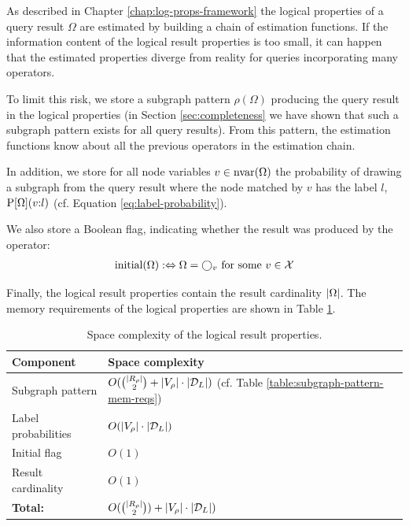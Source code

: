 As described in Chapter \ref{chap:log-props-framework} the logical properties of
a query result $\Omega$ are estimated by building a chain of estimation
functions.
If the information content of the logical result properties is too small,
it can happen that the estimated properties diverge from reality for
queries incorporating many operators.

To limit this risk, we store a subgraph pattern $\rho(\Omega)$ producing the
query result in the logical properties (in Section \ref{sec:completeness} we
have shown that such a subgraph pattern exists for all query results).
From this pattern, the estimation functions know about all the previous
operators in the estimation chain.

In addition, we store for all node variables $v \in \textnormal{nvar}(\Omega)$ the
probability of drawing a subgraph from the query result where the node matched
by $v$ has the label $l$, $\operatorname{P}[\Omega](v{:}l)$
(cf. Equation \ref{eq:label-probability}).

We also store a Boolean flag, indicating whether the result was produced by the
 operator:
\begin{align}
  \textnormal{initial}(\Omega) :\Leftrightarrow \Omega = \bigcirc_{v}
    \text{ for some } v \in \mathcal{X}
\end{align}

Finally, the logical result properties contain the result cardinality
${\left \vert \Omega \right \vert}$.
The memory requirements of the logical properties are shown in Table
\ref{table:neo4j-log-result-props-mem-reqs}.

\begin{table}[H]
\centering
\begin{tabular}{ll}
\toprule
Component                  & Space complexity                                                     \\ \midrule
Subgraph pattern           & $O(\binom{{\left \vert R_\rho \right \vert}}{2} + {\left \vert V_\rho \right \vert} \cdot {\left \vert \mathcal{D}_L\right \vert})$
                             (cf. Table \ref{table:subgraph-pattern-mem-reqs})                    \\[3pt]
Label probabilities        & $O({\left \vert V_\rho \right \vert} \cdot {\left \vert \mathcal{D}_L\right \vert})$                             \\[3pt]
Initial flag               & $O(1)$                                                               \\[3pt]
Result cardinality         & $O(1)$                                                               \\[3pt]
\textbf{Total:}            & $O(\binom{{\left \vert R_\rho \right \vert}}{2}) + {\left \vert V_\rho \right \vert} \cdot {\left \vert \mathcal{D}_L\right \vert})$ \\
\bottomrule
\end{tabular}
\caption{Space complexity of the logical result properties.}
\label{table:neo4j-log-result-props-mem-reqs}
\end{table}

